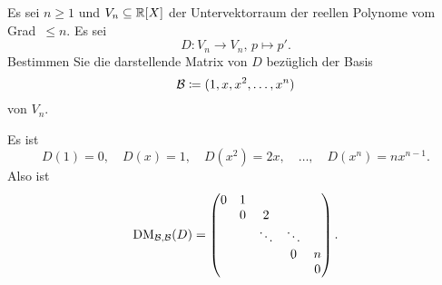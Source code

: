 \begin{question}
 Es sei $n \geq 1$ und $V_n \subseteq \mathbb{R}[X]$ der Untervektorraum der reellen Polynome vom \mbox{Grad $\leq n$}. Es sei
 \[
  D \colon V_n \to V_n, \, p \mapsto p'.
 \]
 Bestimmen Sie die darstellende Matrix von $D$ bezüglich der Basis
 \[
  \mathcal{B} \coloneqq (1, x, x^2, \dotsc, x^n)
 \]
 von $V_n$.
\end{question}
\begin{solution}
 Es ist
 \[
  D(1) = 0, \quad D(x) = 1, \quad D(x^2) = 2x, \quad \dotsc, \quad D(x^n) = n x^{n-1}.
 \]
 Also ist
 \[
  \operatorname{DM}_{\mathcal{\mathcal{B},\mathcal{B}}}(D) =
  \begin{pmatrix}
   0 & 1 &        &        &   \\
     & 0 & 2      &        &   \\
     &   & \ddots & \ddots &   \\
     &   &        & 0      & n \\
     &   &        &        & 0
  \end{pmatrix}.
 \]
\end{solution}


